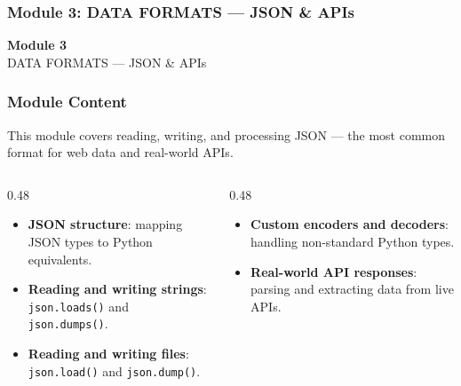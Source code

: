 \documentclass[aspectratio=169,10pt]{beamer}
\newcommand{\keyword}[1]{\textcolor{PrimaryBlue}{\textbf{#1}}}
\newcommand{\codeword}[1]{\texttt{#1}}
\begin{document}
\begin{noheadline}
\begin{frame}
\frametitle{Module 3: DATA FORMATS --- JSON \& APIs}
\vspace{1.2cm}
\begin{center}
  {\fontsize{30}{36}\selectfont\textbf{Module 3}}\\[0.35cm]
  {\fontsize{25}{30}\selectfont DATA FORMATS --- JSON \& APIs}\\[0.7cm]
\end{center}
\end{frame}
\end{noheadline}


\begin{frame}
\frametitle{Module Content}
\small
This module covers reading, writing, and processing JSON --- the most common format for web data and real-world APIs.

\vspace{0.16cm}
\begin{columns}[T,totalwidth=0.96\textwidth]
\begin{column}{0.48\textwidth}
\begin{itemize}\setlength\itemsep{0.08cm}
  \item \keyword{JSON structure}: mapping JSON types to Python equivalents.
  \item \keyword{Reading and writing strings}: \codeword{json.loads()} and \codeword{json.dumps()}.
  \item \keyword{Reading and writing files}: \codeword{json.load()} and \codeword{json.dump()}.
\end{itemize}
\end{column}
\begin{column}{0.48\textwidth}
\begin{itemize}\setlength\itemsep{0.08cm}
  \item \keyword{Custom encoders and decoders}: handling non-standard Python types.
  \item \keyword{Real-world API responses}: parsing and extracting data from live APIs.
\end{itemize}
\end{column}
\end{columns}
\end{frame}
\end{document}

